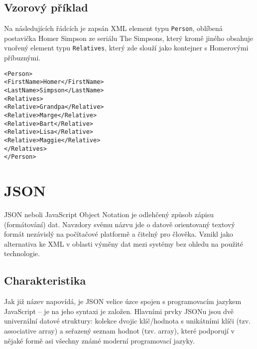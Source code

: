 \subsection{Vzorový příklad}
\label{xmlpriklad}
Na následujících řádcích je zapsán XML element typu \texttt{Person}, oblíbená postavička Homer Simpson ze seriálu The Simpsons, který kromě jiného obsahuje vnořený element typu \texttt{Relatives}, který zde slouží jako kontejner s Homerovými příbuznými.

\texttt{\small<Person>\\
\hspace*{2mm}<FirstName>Homer</FirstName>\\
\hspace*{2mm}<LastName>Simpson</LastName>\\
\hspace*{2mm}<Relatives>\\
\hspace*{4mm}<Relative>Grandpa</Relative>\\
\hspace*{4mm}<Relative>Marge</Relative>\\
\hspace*{4mm}<Relative>Bart</Relative>\\
\hspace*{4mm}<Relative>Lisa</Relative>\\
\hspace*{4mm}<Relative>Maggie</Relative>\\
\hspace*{2mm}</Relatives>\\
</Person>}

\section{JSON}
\label{sectionJson}
JSON neboli JavaScript Object Notation je odlehčený způsob zápisu (formátování) dat. Navzdory svému názvu jde o datově orientovaný textový formát nezávislý na počítačové platformě a čitelný pro člověka. Vznikl jako alternativa ke XML v oblasti výměny dat mezi systémy bez ohledu na použité technologie.

\subsection{Charakteristika}
Jak již název napovídá, je JSON velice úzce spojen s programovacím jazykem JavaScript -- je na jeho syntaxi je založen. Hlavními prvky JSONu jsou dvě univerzální datové struktury: kolekce dvojic klíč/hodnota s unikátními klíči (tzv. associative array) a seřazený seznam hodnot (tzv. array), které podporují v nějaké formě asi všechny známé moderní programovací jazyky.

